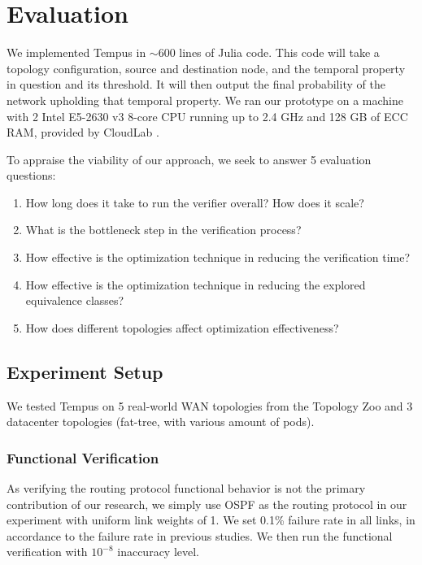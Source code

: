 \section{Evaluation}

We implemented Tempus in $\sim600$ lines of Julia \cite{julia} code.
This code will take a topology configuration, source and destination node, and the 
temporal property in question and its threshold.
It will then output the final probability of the network upholding that temporal property.
We ran our prototype on a machine with 2 Intel E5-2630 v3 8-core CPU running up to 2.4 GHz 
and 128 GB of ECC RAM, provided by CloudLab \cite{cloudlab}.

To appraise the viability of our approach, we seek to answer 5 evaluation questions:
\begin{enumerate}
    \item How long does it take to run the verifier overall? How does it scale?
    \item What is the bottleneck step in the verification process?
    \item How effective is the optimization technique in reducing the verification time?
    \item How effective is the optimization technique in reducing the explored equivalence classes?
    \item How does different topologies affect optimization effectiveness?
\end{enumerate}

\subsection{Experiment Setup}



We tested Tempus on 5 real-world WAN topologies from the Topology Zoo and 3 datacenter topologies 
(fat-tree, with various amount of pods).

\subsubsection{Functional Verification}
As verifying the routing protocol functional behavior is not the primary contribution of our research, 
we simply use OSPF as the routing protocol in our experiment with uniform link weights of 1.
We set 0.1\% failure rate in all links, in accordance to the failure rate in previous studies. %
We then run the functional verification with $10^{-8}$ inaccuracy level.

